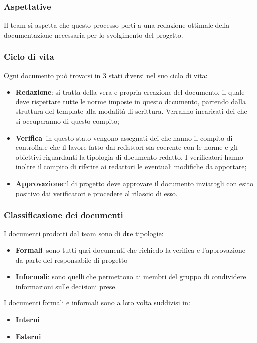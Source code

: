 \subsubsection{Aspettative}
Il team si aspetta che questo processo porti a una redazione ottimale della documentazione necessaria per lo svolgimento del progetto.

\subsubsection{Ciclo di vita}
Ogni documento può trovarsi in 3 stati diversi nel suo ciclo di vita:
\begin{itemize}
    \item\textbf{Redazione}: si tratta della vera e propria creazione del documento, il quale deve rispettare tutte le norme imposte in questo documento, partendo dalla struttura del template alla modalità di scrittura. Verranno incaricati dei  che si occuperanno di questo compito;
    \item\textbf{Verifica}: in questo stato vengono assegnati dei  che hanno il compito di controllare che il lavoro fatto dai redattori sia coerente con le norme e gli obiettivi riguardanti la tipologia di documento redatto. I verificatori hanno inoltre il compito di riferire ai redattori le eventuali modifiche da apportare;
    \item\textbf{Approvazione}:il  di progetto deve approvare il documento inviatogli con esito positivo dai verificatori e procedere al rilascio di esso.
\end{itemize}

\subsubsection{Classificazione dei documenti}
I documenti prodotti dal team sono di due tipologie:
\begin{itemize}
    \item \textbf{Formali}: sono tutti quei documenti che richiedo la verifica e l'approvazione da parte del responsabile di progetto;
    \item\textbf{Informali}: sono quelli che permettono ai membri del gruppo di condividere informazioni sulle decisioni prese.
\end{itemize}
I documenti formali e informali sono a loro volta suddivisi in:
\begin{itemize}
    \item\textbf{Interni}
    \item\textbf{Esterni}
\end{itemize}

